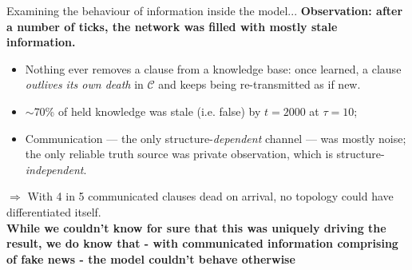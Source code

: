 \documentclass[aspectratio=169,11pt]{beamer}
\begin{document}
\begin{frame}{Examining the behaviour of information inside the model...}
   \textbf{Observation: after a number of ticks, the network was filled with mostly stale information.}
      \begin{itemize}\small
        \item Nothing ever removes a clause from a knowledge base: once learned,
              a clause \emph{outlives its own death} in $\mathcal{C}$ and keeps being
              re-transmitted as if new.
        \item $\sim$70\% of held knowledge was stale (i.e. false) by $t=2000$ at $\tau=10$;
        \item Communication --- the only structure-\emph{dependent} channel --- was
              mostly noise; the only reliable truth source was private observation,
              which is structure-\emph{independent}.
      \end{itemize}
      \small $\Rightarrow$ With 4 in 5 communicated clauses dead on arrival, no topology could
      have differentiated itself.
        \vspace{4pt}
      \\
      \textbf{While we couldn't know for sure that this was uniquely driving the result, we do know that - with communicated information comprising of fake news - the model couldn't behave otherwise}
\end{frame}
\end{document}

